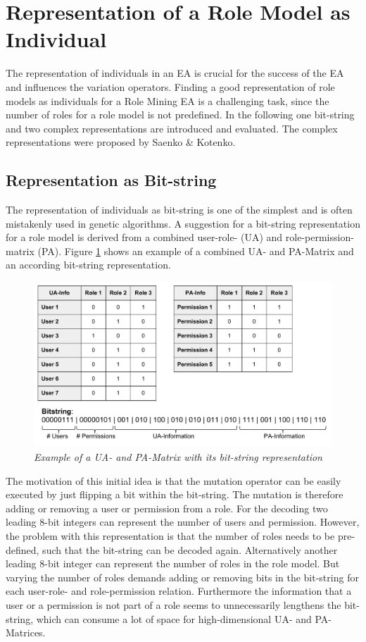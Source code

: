     \section{Representation of a Role Model as Individual}
    The representation of individuals in an EA is crucial for the success of the EA and influences the variation operators. Finding a good representation of role models as individuals for a Role Mining EA is a challenging task, since the number of roles for a role model is not predefined. In the following one bit-string and two complex representations are introduced and evaluated. The complex representations were proposed by Saenko \& Kotenko\cite{saenko2012design}.
        \subsection{Representation as Bit-string}
        The representation of individuals as bit-string is one of the simplest and is often mistakenly used in genetic algorithms\cite{Eiben}. A suggestion for a bit-string representation for a role model is derived from a combined user-role- (UA) and role-permission-matrix (PA). Figure \ref{fig:representation1} shows an example of a combined UA- and PA-Matrix and an according bit-string representation.
        \begin{figure}
            \centering
            \includegraphics[scale=0.5]{./Figures/BitstringRepresentation}
            \caption{\textit{Example of a UA- and PA-Matrix with its bit-string representation}}
            \label{fig:representation1}
        \end{figure}
        The motivation of this initial idea is that the mutation operator can be easily executed by just flipping a bit within the bit-string. The mutation is therefore adding or removing a user or permission from a role. For the decoding two leading 8-bit integers can represent the number of users and permission. However, the problem with this representation is that the number of roles needs to be pre-defined, such that the bit-string can be decoded again. Alternatively another leading 8-bit integer can represent the number of roles in the role model. But varying the number of roles demands adding or removing bits in the bit-string for each user-role- and role-permission relation. Furthermore the information that a user or a permission is not part of a role seems to unnecessarily lengthens the bit-string, which can consume a lot of space for high-dimensional UA- and PA-Matrices.
